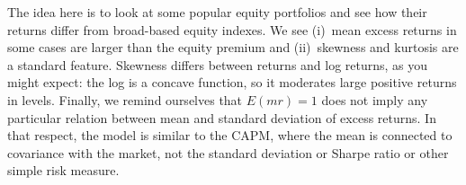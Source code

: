 \documentclass[11pt]{exam}
\begin{document}
\begin{questions}

\begin{solution}
The idea here is to look at some popular equity portfolios
and see how their returns differ from broad-based equity indexes.  
We see (i)~mean excess returns in some cases are larger than the equity premium
and (ii)~skewness and kurtosis are a standard feature. 
Skewness differs between returns and log returns, as you might expect:
the log is a concave function, so it moderates large positive returns in levels.
Finally, we remind ourselves that $ E(mr) = 1$ does not imply 
any particular relation between mean and standard deviation of excess returns.
In that respect, the model is similar to the CAPM, where the mean is connected to 
covariance with the market, not the standard deviation or Sharpe ratio
or other simple risk measure.  

\end{solution}
\end{questions}
\end{document}
